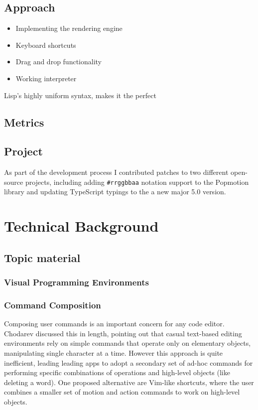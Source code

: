 \documentclass[11pt]{report}
\begin{document}
\section{Approach}

\begin{itemize}
	\item Implementing the rendering engine
	\item Keyboard shortcuts
	\item Drag and drop functionality
	\item Working interpreter
\end{itemize}
Lisp's highly uniform syntax, makes it the perfect 

\section{Metrics}
\section{Project}

As part of the development process I contributed patches to two different
open-source projects, including adding \texttt{\#rrggbbaa} notation support
to the Popmotion library \cite{github-pr-popmotion} and updating
 TypeScript typings to the a new major 5.0
version\cite{github-pr-styled-components}.

\chapter{Technical Background}

\section{Topic material}

\subsection{Visual Programming Environments}


\subsection{Command Composition}
Composing user commands is an important concern for any code editor. Chodarev
\cite{Chodarev2016} discussed this in length, pointing out that casual
text-based editing environments rely on simple commands that operate only on
elementary objects, manipulating single character at a time. However this
approach is quite inefficient, leading leading apps to adopt a secondary set of
ad-hoc commands for performing specific combinations of operations and
high-level objects (like deleting a word). One proposed alternative are
Vim-like shortcuts, where the user combines a smaller set of motion and action
commands to work on high-level objects.
\end{document}

